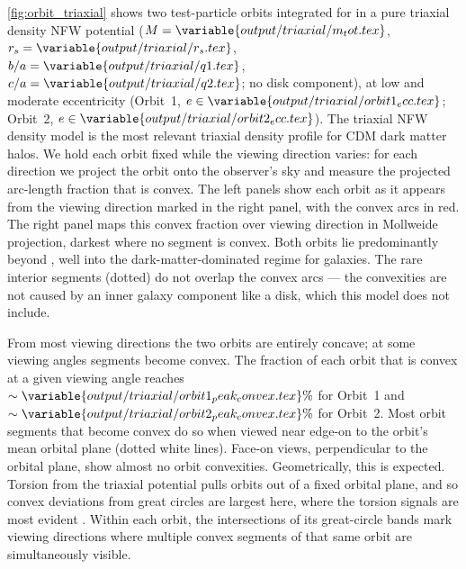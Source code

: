 \documentclass[linenumbers,twocolumn]{aastex701}
\begin{document}
        \autoref{fig:orbit_triaxial} shows two test-particle orbits integrated for  in a pure triaxial density \gls{NFW} potential ($M = \variable{output/triaxial/m_tot.tex}$, $r_s = \variable{output/triaxial/r_s.tex}$, $b/a = \variable{output/triaxial/q1.tex}$, $c/a = \variable{output/triaxial/q2.tex}$; no disk component), at low and moderate eccentricity (Orbit~1, $e \in \variable{output/triaxial/orbit1_ecc.tex}$; Orbit~2, $e \in \variable{output/triaxial/orbit2_ecc.tex}$). %
        The triaxial \gls{NFW} density model \citep{Navarro+:1996:StructureColdDark, Navarro+:1997:UniversalDensityProfile} is the most relevant triaxial density profile for \gls{CDM} dark matter halos. %
        We hold each orbit fixed while the viewing direction varies: for each direction we project the orbit onto the observer's sky and measure the projected arc-length fraction that is convex. %
        The left panels show each orbit as it appears from the viewing direction marked in the right panel, with the convex arcs in red. %
        The right panel maps this convex fraction over viewing direction in Mollweide projection, darkest where no segment is convex. %
        Both orbits lie predominantly beyond , well into the dark-matter-dominated regime for galaxies. %
        The rare interior segments (dotted) do not overlap the convex arcs --- the convexities are not caused by an inner galaxy component like a disk, which this model does not include. %

        From most viewing directions the two orbits are entirely concave; at some viewing angles segments become convex. %
        The fraction of each orbit that is convex at a given viewing angle reaches $\sim \variable{output/triaxial/orbit1_peak_convex.tex}\%$ for Orbit~1 and $\sim \variable{output/triaxial/orbit2_peak_convex.tex}\%$ for Orbit~2. %
        Most orbit segments that become convex do so when viewed near edge-on to the orbit's mean orbital plane (dotted white lines). %
        Face-on views, perpendicular to the orbital plane, show almost no orbit convexities. %
        Geometrically, this is expected. %
        Torsion from the triaxial potential pulls orbits out of a fixed orbital plane, and so convex deviations from great circles are largest here, where the torsion signals are most evident \citep{Bariego-Quintana:2024:TorsionStellarStreams}. %
        Within each orbit, the intersections of its great-circle bands mark viewing directions where multiple convex segments of that same orbit are simultaneously visible. %
    
\end{document}

